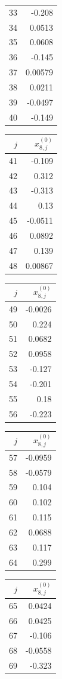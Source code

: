 {\begin{tabular}[t]{r|r}
33 & -0.208 \\
34 & 0.0513 \\
35 & 0.0608 \\
36 & -0.145 \\
37 & 0.00579 \\
38 & 0.0211 \\
39 & -0.0497 \\
40 & -0.149
\end{tabular}\kern4pt
\begin{tabular}[t]{r|r}
$j$ & $x^{(0)}_{8,j}$ \\\hline
41 & -0.109 \\
42 & 0.312 \\
43 & -0.313 \\
44 & 0.13 \\
45 & -0.0511 \\
46 & 0.0892 \\
47 & 0.139 \\
48 & 0.00867
\end{tabular}\kern4pt
\begin{tabular}[t]{r|r}
$j$ & $x^{(0)}_{8,j}$ \\\hline
49 & -0.0026 \\
50 & 0.224 \\
51 & 0.0682 \\
52 & 0.0958 \\
53 & -0.127 \\
54 & -0.201 \\
55 & 0.18 \\
56 & -0.223
\end{tabular}\kern4pt
\begin{tabular}[t]{r|r}
$j$ & $x^{(0)}_{8,j}$ \\\hline
57 & -0.0959 \\
58 & -0.0579 \\
59 & 0.104 \\
60 & 0.102 \\
61 & 0.115 \\
62 & 0.0688 \\
63 & 0.117 \\
64 & 0.299
\end{tabular}\kern4pt
\begin{tabular}[t]{r|r}
$j$ & $x^{(0)}_{8,j}$ \\\hline
65 & 0.0424 \\
66 & 0.0425 \\
67 & -0.106 \\
68 & -0.0558 \\
69 & -0.323 \\

\end{tabular}}
